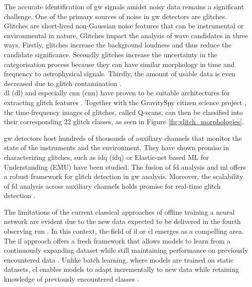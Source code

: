 The accurate identification of \acrshort{gw} signals amidst noisy data remains a significant challenge. One of the primary sources of noise in \acrshort{gw} detectors are glitches. 
Glitches are short-lived non-Gaussian noise features that can be instrumental or environmental in nature. Glitches impact the analysis of wave candidates in three ways. Firstly, glitches increase the background loudness and thus reduce the candidate significance. Secondly glitches increase the uncertainty in the categorisation process because they can have similar morphology in time and frequency to astrophysical signals. Thirdly, the amount of usable data is even decreased due to glitch contamination \citep{zevin2017gravity, cuoco2020enhancing}. \\
\acrlong{dl} (\acrshort{dl}) and especially \acrlong{cnn} (\acrshort{cnn}) have proven to be suitable architectures for extracting glitch features \citep{george2017deep,glanzer2023data,fernandes2023convolutional}. Together with the GravitySpy citizen science project \citep{bahaadini2018machine, zevin2017gravity}, the time-frequency images of glitches, called Q-scans, can then be classified into their corresponding 22 glitch classes, as seen in Figure \ref{fig:glitch_morphologies}.

\acrshort{gw} detectors host hundreds of thousands of auxiliary channels that monitor the state of the instruments and the environment. They have shown promise in characterizing glitches, such as \acrlong{idq} (\acrshort{idq}) \citep{essick2020idq,davis2022detector} or Elastic-net based ML for Understanding (EMU) \citep{colgan2020efficient} have been studied. The fusion of \acrfull{fd} analysis and \acrshort{ml} offers a robust framework for glitch detection in \acrshort{gw} analysis. Moreover, the scalability of \acrshort{fd} analysis across auxiliary channels holds promise for real-time glitch detection \citep{colgan2020efficient, benedetto2023ai}.

The limitations of the current classical approaches of offline training a neural network are evident due to the new data expected to be delivered in the fourth observing run \citep{wu2024advancing}. In this context, the field of \acrfull{il} or \acrshort{cl} emerges as a compelling area. The \acrshort{il} approach offers a fresh framework that allows models to learn from a continuously expanding dataset while still maintaining performance on previously encountered data \citep{van2022three, qu2021recent, de2021continual}.
Unlike batch learning, where models are trained on static datasets, \acrshort{cl} enables models to adapt incrementally to new data while retaining knowledge of previously encountered classes \citep{kirkpatrick2017overcoming}. 


